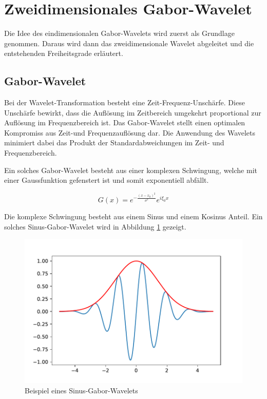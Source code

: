 \section{Zweidimensionales Gabor-Wavelet}

Die Idee des eindimensionalen Gabor-Wavelets wird zuerst als Grundlage genommen. 
Daraus wird dann das zweidimensionale Wavelet abgeleitet und die entstehenden Freiheitsgrade erläutert.

\subsection{Gabor-Wavelet}

Bei der Wavelet-Transformation besteht eine Zeit-Frequenz-Unschärfe.
Diese Unschärfe bewirkt, dass die Auflösung im Zeitbereich umgekehrt proportional zur Auflösung im Frequenzbereich ist.
Das Gabor-Wavelet stellt einen optimalen Kompromiss aus Zeit-und Frequenzauflösung dar.
Die Anwendung des Wavelets minimiert dabei das Produkt der Standardabweichungen im Zeit- und Frequenzbereich. \cite{paper:communication}

Ein solches Gabor-Wavelet besteht aus einer komplexen Schwingung, welche mit einer Gaussfunktion gefenstert ist und somit exponentiell abfällt.

\begin{equation}
G(x)= e^{-\frac{(x-x_{0})^{2}}{\sigma^{2}}} e^{i\xi_{0}x}
\end{equation}


Die komplexe Schwingung besteht aus einem Sinus und einem  Kosinus Anteil. 
Ein solches Sinus-Gabor-Wavelet wird in Abbildung \ref{fig:gabor1d} gezeigt.

\begin{figure}
	\centering
	\includegraphics[width=0.7\linewidth]{./papers/visuell/images/gabor_1d}
	\caption{Beispiel eines Sinus-Gabor-Wavelets}
	\label{fig:gabor1d}
\end{figure}


